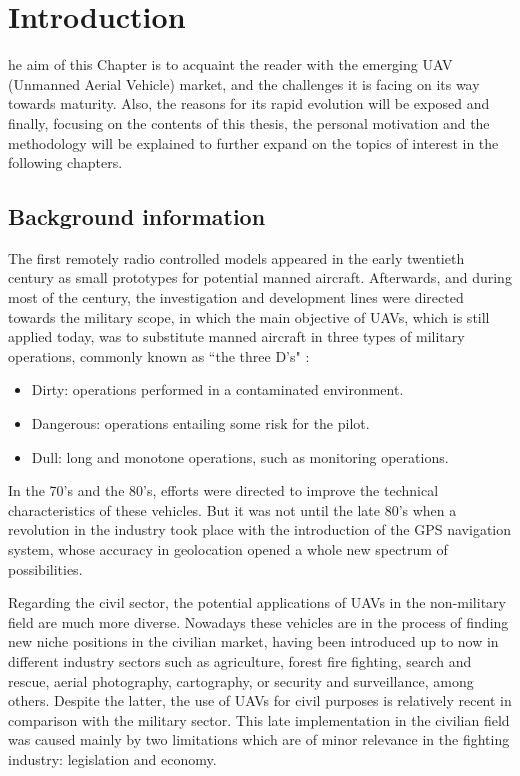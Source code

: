 %
%
\let\textcircled=\pgftextcircled
\chapter{Introduction}

he aim of this Chapter is to acquaint the reader with the emerging UAV (Unmanned Aerial Vehicle) market, and the challenges it is facing on its way towards maturity.
Also, the reasons for its rapid evolution will be exposed and finally, focusing on the contents of this thesis, the personal motivation and the methodology will be explained to further expand on the topics of interest in the following chapters.

\section{Background information} \label{sec:background}

The first remotely radio controlled models appeared in the early twentieth century as small prototypes for potential manned aircraft. 
Afterwards, and during most of the century, the investigation and development lines were directed towards the military scope, in which the main objective of UAVs, which is still applied today, was to substitute manned aircraft in three types of military operations, commonly known as ``the three D's" \cite{daily2015,uasapplications2016}:

\begin{itemize}
	\item Dirty: operations performed in a contaminated environment.
	\item Dangerous: operations entailing some risk for the pilot.
	\item Dull: long and monotone operations, such as monitoring operations.
\end{itemize}

In the 70's and the 80's, efforts were directed to improve the technical characteristics of these vehicles.
But it was not until the late 80's when a revolution in the industry took place with the introduction of the GPS navigation system, whose accuracy in geolocation opened a whole new spectrum of possibilities.

Regarding the civil sector, the potential applications of UAVs in the non-military field are much more diverse.
Nowadays these vehicles are in the process of finding new niche positions in the civilian market, having been introduced up to now in different industry sectors such as agriculture, forest fire fighting, search and rescue, aerial photography, cartography, or security and surveillance, among others. 
Despite the latter, the use of UAVs for civil purposes is relatively recent in comparison with the military sector.
This late implementation in the civilian field was caused mainly by two limitations which are of minor relevance in the fighting industry: legislation and economy.
\cite{aguado2016}

